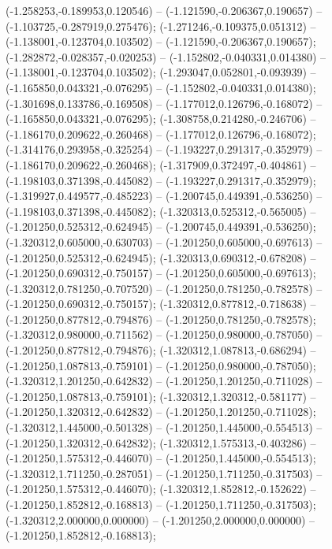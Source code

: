  (-1.258253,-0.189953,0.120546) -- (-1.121590,-0.206367,0.190657) -- (-1.103725,-0.287919,0.275476);
 (-1.271246,-0.109375,0.051312) -- (-1.138001,-0.123704,0.103502) -- (-1.121590,-0.206367,0.190657);
 (-1.282872,-0.028357,-0.020253) -- (-1.152802,-0.040331,0.014380) -- (-1.138001,-0.123704,0.103502);
 (-1.293047,0.052801,-0.093939) -- (-1.165850,0.043321,-0.076295) -- (-1.152802,-0.040331,0.014380);
 (-1.301698,0.133786,-0.169508) -- (-1.177012,0.126796,-0.168072) -- (-1.165850,0.043321,-0.076295);
 (-1.308758,0.214280,-0.246706) -- (-1.186170,0.209622,-0.260468) -- (-1.177012,0.126796,-0.168072);
 (-1.314176,0.293958,-0.325254) -- (-1.193227,0.291317,-0.352979) -- (-1.186170,0.209622,-0.260468);
 (-1.317909,0.372497,-0.404861) -- (-1.198103,0.371398,-0.445082) -- (-1.193227,0.291317,-0.352979);
 (-1.319927,0.449577,-0.485223) -- (-1.200745,0.449391,-0.536250) -- (-1.198103,0.371398,-0.445082);
 (-1.320313,0.525312,-0.565005) -- (-1.201250,0.525312,-0.624945) -- (-1.200745,0.449391,-0.536250);
 (-1.320312,0.605000,-0.630703) -- (-1.201250,0.605000,-0.697613) -- (-1.201250,0.525312,-0.624945);
 (-1.320313,0.690312,-0.678208) -- (-1.201250,0.690312,-0.750157) -- (-1.201250,0.605000,-0.697613);
 (-1.320312,0.781250,-0.707520) -- (-1.201250,0.781250,-0.782578) -- (-1.201250,0.690312,-0.750157);
 (-1.320312,0.877812,-0.718638) -- (-1.201250,0.877812,-0.794876) -- (-1.201250,0.781250,-0.782578);
 (-1.320312,0.980000,-0.711562) -- (-1.201250,0.980000,-0.787050) -- (-1.201250,0.877812,-0.794876);
 (-1.320312,1.087813,-0.686294) -- (-1.201250,1.087813,-0.759101) -- (-1.201250,0.980000,-0.787050);
 (-1.320312,1.201250,-0.642832) -- (-1.201250,1.201250,-0.711028) -- (-1.201250,1.087813,-0.759101);
 (-1.320312,1.320312,-0.581177) -- (-1.201250,1.320312,-0.642832) -- (-1.201250,1.201250,-0.711028);
 (-1.320312,1.445000,-0.501328) -- (-1.201250,1.445000,-0.554513) -- (-1.201250,1.320312,-0.642832);
 (-1.320312,1.575313,-0.403286) -- (-1.201250,1.575312,-0.446070) -- (-1.201250,1.445000,-0.554513);
 (-1.320312,1.711250,-0.287051) -- (-1.201250,1.711250,-0.317503) -- (-1.201250,1.575312,-0.446070);
 (-1.320312,1.852812,-0.152622) -- (-1.201250,1.852812,-0.168813) -- (-1.201250,1.711250,-0.317503);
 (-1.320312,2.000000,0.000000) -- (-1.201250,2.000000,0.000000) -- (-1.201250,1.852812,-0.168813);
